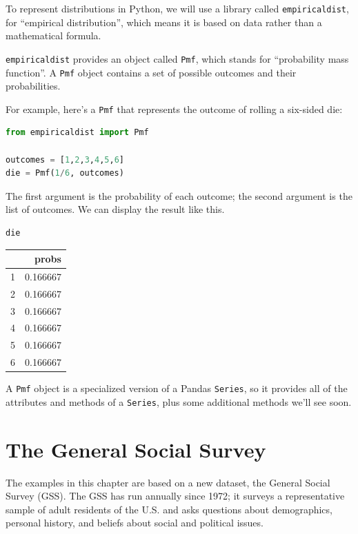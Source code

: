 To represent distributions in Python, we will use a library called
\passthrough{\lstinline!empiricaldist!}, for ``empirical distribution'',
which means it is based on data rather than a mathematical formula.

\passthrough{\lstinline!empiricaldist!} provides an object called
\passthrough{\lstinline!Pmf!}, which stands for ``probability mass
function''. A \passthrough{\lstinline!Pmf!} object contains a set of
possible outcomes and their probabilities.

For example, here's a \passthrough{\lstinline!Pmf!} that represents the
outcome of rolling a six-sided die:

\begin{lstlisting}[language=Python]
from empiricaldist import Pmf

outcomes = [1,2,3,4,5,6]
die = Pmf(1/6, outcomes)
\end{lstlisting}

The first argument is the probability of each outcome; the second
argument is the list of outcomes. We can display the result like this.

\begin{lstlisting}[language=Python]
die
\end{lstlisting}

\begin{tabular}{lr}
\toprule
{} &     probs \\
\midrule
1 &  0.166667 \\
2 &  0.166667 \\
3 &  0.166667 \\
4 &  0.166667 \\
5 &  0.166667 \\
6 &  0.166667 \\
\bottomrule
\end{tabular}

A \passthrough{\lstinline!Pmf!} object is a specialized version of a
Pandas \passthrough{\lstinline!Series!}, so it provides all of the
attributes and methods of a \passthrough{\lstinline!Series!}, plus some
additional methods we'll see soon.

\hypertarget{the-general-social-survey}{%
\section{The General Social Survey}\label{the-general-social-survey}}

The examples in this chapter are based on a new dataset, the General
Social Survey (GSS). The GSS has run annually since 1972; it surveys a
representative sample of adult residents of the U.S. and asks questions
about demographics, personal history, and beliefs about social and
political issues.

